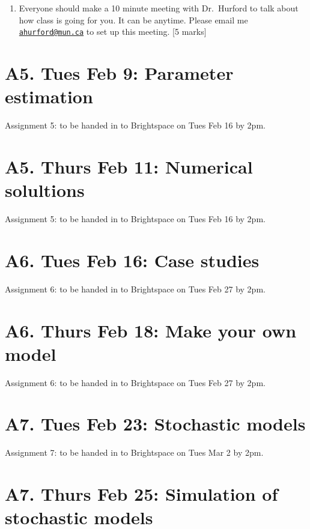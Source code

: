 \documentclass[]{book}
\providecommand{\tightlist}{%
  \setlength{\itemsep}{0pt}\setlength{\parskip}{0pt}}
\begin{document}
\begin{enumerate}
\def\labelenumi{\arabic{enumi}.}
\setcounter{enumi}{4}
\tightlist
\item
  Everyone should make a 10 minute meeting with Dr.~Hurford to talk
  about how class is going for you. It can be anytime. Please email me
  \href{mailto:ahurford@mun.ca}{\nolinkurl{ahurford@mun.ca}} to set up
  this meeting. {[}5 marks{]}
\end{enumerate}

\chapter{A5. Tues Feb 9: Parameter
estimation}\label{a5.-tues-feb-9-parameter-estimation}

Assignment 5: to be handed in to Brightspace on Tues Feb 16 by 2pm.

\chapter{A5. Thurs Feb 11: Numerical
solultions}\label{a5.-thurs-feb-11-numerical-solultions}

Assignment 5: to be handed in to Brightspace on Tues Feb 16 by 2pm.

\chapter{A6. Tues Feb 16: Case
studies}\label{a6.-tues-feb-16-case-studies}

Assignment 6: to be handed in to Brightspace on Tues Feb 27 by 2pm.

\chapter{A6. Thurs Feb 18: Make your own
model}\label{a6.-thurs-feb-18-make-your-own-model}

Assignment 6: to be handed in to Brightspace on Tues Feb 27 by 2pm.

\chapter{A7. Tues Feb 23: Stochastic
models}\label{a7.-tues-feb-23-stochastic-models}

Assignment 7: to be handed in to Brightspace on Tues Mar 2 by 2pm.

\chapter{A7. Thurs Feb 25: Simulation of stochastic
models}\label{a7.-thurs-feb-25-simulation-of-stochastic-models}
\end{document}

